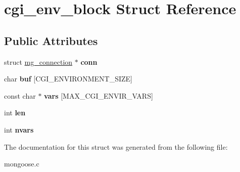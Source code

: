 \hypertarget{structcgi__env__block}{\section{cgi\-\_\-env\-\_\-block Struct Reference}
\label{structcgi__env__block}
}
\subsection*{Public Attributes}
\begin{DoxyCompactItemize}
\item 
\hypertarget{structcgi__env__block_a690d939b7e443d589d89803b36a1a20d}{struct \hyperlink{structmg__connection}{mg\-\_\-connection} $\ast$ {\bfseries conn}}\label{structcgi__env__block_a690d939b7e443d589d89803b36a1a20d}

\item 
\hypertarget{structcgi__env__block_acde439ca8be77fbb1061e760e3688d8d}{char {\bfseries buf} \mbox{[}C\-G\-I\-\_\-\-E\-N\-V\-I\-R\-O\-N\-M\-E\-N\-T\-\_\-\-S\-I\-Z\-E\mbox{]}}\label{structcgi__env__block_acde439ca8be77fbb1061e760e3688d8d}

\item 
\hypertarget{structcgi__env__block_a0bf64b1ac2c4132baab8f16e891a7cbb}{const char $\ast$ {\bfseries vars} \mbox{[}M\-A\-X\-\_\-\-C\-G\-I\-\_\-\-E\-N\-V\-I\-R\-\_\-\-V\-A\-R\-S\mbox{]}}\label{structcgi__env__block_a0bf64b1ac2c4132baab8f16e891a7cbb}

\item 
\hypertarget{structcgi__env__block_a6455757faba75fde382e24e5bea25cb5}{int {\bfseries len}}\label{structcgi__env__block_a6455757faba75fde382e24e5bea25cb5}

\item 
\hypertarget{structcgi__env__block_ab409c99d6f905fe2e467aba8aa081fc4}{int {\bfseries nvars}}\label{structcgi__env__block_ab409c99d6f905fe2e467aba8aa081fc4}

\end{DoxyCompactItemize}


The documentation for this struct was generated from the following file\-:\begin{DoxyCompactItemize}
\item 
mongoose.\-c\end{DoxyCompactItemize}

